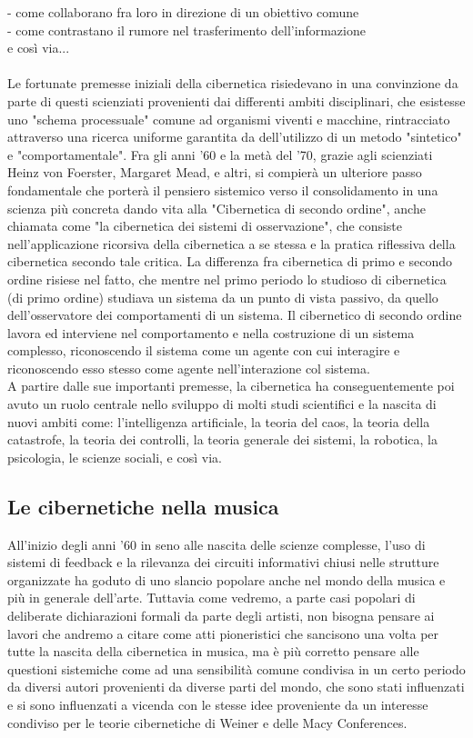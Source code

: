 - come collaborano fra loro in direzione di un obiettivo comune
\\
- come contrastano il rumore nel trasferimento dell'informazione
\\
  e così via...
\\ \\
Le fortunate premesse iniziali della cibernetica risiedevano in una convinzione
da parte di questi scienziati provenienti dai differenti ambiti disciplinari,
che esistesse uno "schema processuale" comune ad organismi viventi e macchine,
rintracciato attraverso una ricerca uniforme garantita da dell'utilizzo di un metodo
"sintetico" e "comportamentale".
Fra gli anni '60 e la metà del '70, grazie agli scienziati
Heinz von Foerster, Margaret Mead, e altri,
si compierà un ulteriore passo fondamentale che porterà
il pensiero sistemico verso il consolidamento in una scienza più concreta
dando vita alla "Cibernetica di secondo ordine",
anche chiamata come "la cibernetica dei sistemi di osservazione",
che consiste nell'applicazione
ricorsiva della cibernetica a se stessa e la pratica riflessiva della cibernetica
secondo tale critica.
La differenza fra cibernetica di primo e secondo ordine risiese nel fatto,
che mentre nel primo periodo lo studioso di cibernetica (di primo ordine)
studiava un sistema da un punto di vista passivo, da quello dell'osservatore
dei comportamenti di un sistema.
Il  cibernetico di secondo ordine lavora ed interviene nel comportamento
e nella costruzione di un sistema complesso,
riconoscendo il sistema come un agente con cui interagire e
riconoscendo esso stesso come agente nell'interazione col sistema. \\
A partire dalle sue importanti premesse,
la cibernetica ha conseguentemente poi avuto un ruolo centrale nello sviluppo di
molti studi scientifici e la nascita
di nuovi ambiti come: l'intelligenza artificiale, la teoria del caos,
la teoria della catastrofe,
la teoria dei controlli, la teoria generale dei sistemi, la robotica,
la psicologia, le scienze sociali, e così via.

\subsection{Le cibernetiche nella musica}
\label{sec:Le cibernetiche nella musica}
All'inizio degli anni '60 in seno alle nascita delle scienze complesse,
l'uso di sistemi di feedback e la rilevanza dei circuiti informativi chiusi
nelle strutture organizzate
ha goduto di uno slancio popolare anche nel mondo della musica
e più in generale dell'arte.
Tuttavia come vedremo, a parte casi popolari di deliberate dichiarazioni
formali da parte degli artisti, non bisogna pensare ai lavori che andremo a citare
come atti pioneristici che sancisono una volta per tutte la nascita della cibernetica in musica,
ma è più corretto pensare alle questioni sistemiche come ad una sensibilità
comune condivisa in un certo periodo da diversi autori provenienti da diverse parti del mondo, 
che sono stati influenzati e si sono influenzati a vicenda 
con le stesse idee proveniente da un interesse condiviso per le teorie cibernetiche di Weiner e delle Macy Conferences.

